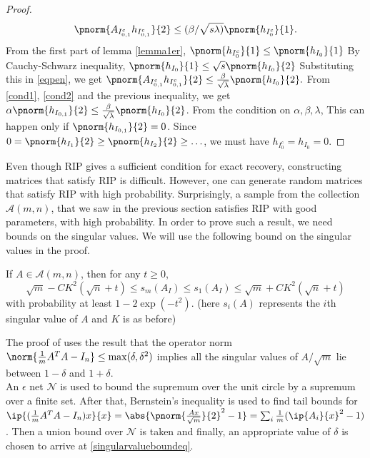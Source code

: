 \begin{proof}
\begin{equation}
			\pnorm{A_{I_{0,1}^c}h_{I_{0,1}^c}}{2}\leq (\beta/\sqrt{s\lambda)}\pnorm{h_{I_0^c}}{1}.
        \end{equation}
    From the first part of lemma \ref{lemma1er}, $\pnorm{h_{I_0^c}}{1}\leq \pnorm{h_{I_0}}{1}$
    By Cauchy-Schwarz inequality, $\pnorm{h_{I_0}}{1}\leq \sqrt{s}\pnorm{h_{I_0}}{2}$
    Substituting this in \eqref{eqpen}, we get
    $
        \pnorm{A_{I_{0,1}^c}h_{I_{0,1}^c}}{2}\leq \frac{\beta}{\sqrt{\lambda}}\pnorm{h_{I_0}}{2}.
    $
    From \eqref{cond1}, \eqref{cond2} and the previous inequality, we get
    $
        \alpha \pnorm{h_{I_{0,1}}}{2} \leq \frac{\beta}{\sqrt{\lambda}} \pnorm{h_{I_{0}}}{2}
    $.
    From the condition on $\alpha,\beta, \lambda$, This can happen only if $\pnorm{h_{I_{0,1}}}{2} = 0$.
    Since $0 = \pnorm{h_{I_1}}{2}\geq \pnorm{h_{I_2}}{2}\geq \ldots$, we must have $h_{I_0^c} = h_{I_0} = 0$.
\end{proof}

Even though RIP gives a sufficient condition for exact
recovery, constructing matrices that satisfy RIP is difficult.
However, one can generate random matrices that satisfy RIP
with high probability. Surprisingly, a sample from the collection
$\mathcal{A}(m, n)$, that we saw in the previous section
satisfies RIP with good parameters, with high probability.
In order to prove such a result, we need bounds on the singular values.
We will use
the following bound on the singular values in the proof.
\begin{theorem}\label{singularvaluebounds}
	If $A\in\mathcal{A}(m, n)$, then for any
	$t\geq 0$,
	\begin{equation}\label{singularvalueboundeq}
		\sqrt{m} - CK^2(\sqrt{n}+t)\leq s_m(A_I)\leq s_1(A_I)
			\leq \sqrt{m} + CK^2(\sqrt{n}+t)
	\end{equation}
	with probability at least $1-2\exp(-t^2)$. (here $s_i(A)$
	represents the $i$th singular value of $A$ and $K$ is as before)
\end{theorem}
\noindent
The proof of uses the result that the operator norm
$\norm{\frac{1}{m}A^TA - I_n}\leq \max(\delta, \delta^2)$ implies
all the singular values of $A/\sqrt{m}$
lie between $1-\delta$ and $1+\delta$.\\
An $\epsilon$ net $\mathcal{N}$ is used to bound
the supremum over the unit circle by a supremum over a
finite set.
After that, Bernstein's inequality is used to find tail bounds
for ${\ip{(\frac{1}{m}A^TA-I_n)x}{x}} = 
\abs{\pnorm{\frac{Ax}{\sqrt{m}}}{2}^2 - 1} = 
\sum_i \frac{1}{m}(\ip{A_i}{x}^2-1)$.
Then a union bound over $\mathcal{N}$ is taken
and finally, an appropriate value of $\delta$ is chosen
to arrive at \eqref{singularvalueboundeq}.
\indent

